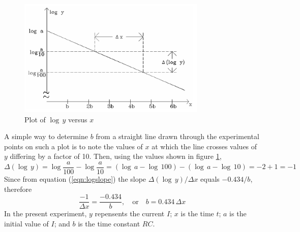 \begin{figure}[h]
    \begin{center}
        \includegraphics[width=0.8\textwidth]{./Exp4/pic/image5.png}
    \end{center}
    \caption{Plot of $\log\,y$ versus $x$}
    \label{fig:logplot}
\end{figure}

A simple way to determine $b$ from a straight line drawn through the experimental points on such a plot is to note the values of $x$ at which the line crosses values of $y$ differing by a factor of 10. Then, using the values shown in figure \ref{fig:logplot},
\begin{equation}
    \Delta(\log\,y) = \log\frac{a}{100} - \log\frac{a}{10} = (\log\,a - \log\,100) - (\log\,a - \log\,10) = -2+1 = -1
\end{equation}
Since from equation (\ref{eqn:logslope}) the slope $\Delta(\log\,y)/\Delta x$ equals $-0.434/b$, therefore
\begin{equation}
    \frac{-1}{\Delta x} = \frac{-0.434}{b},\quad\text{or}\quad b = 0.434\,\Delta x
\end{equation}
In the present experiment, $y$ repensents the current $I$; $x$ is the time $t$; $a$ is the initial value of $I$; and $b$ is the time constant $RC$. \myskip

